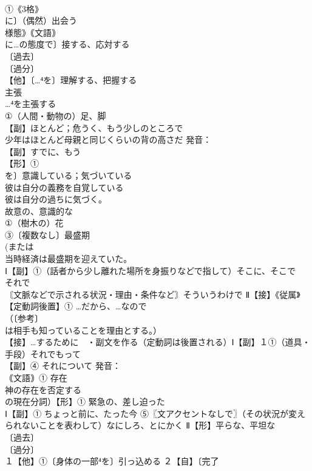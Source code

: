 \documentclass[8pt]{extreport}
\begin{document}
\begin{CJK}{UTF8}{min}
\\	①《3格》
\\	に〕（偶然）出会う 
\\	様態》｟文語｠
\\	に…の態度で〕接する、応対する 
\\	〔過去〕
\\	〔過分〕
\\	【他】〔…⁴を〕理解する、把握する 
\\	主張 
\\	…⁴を主張する
\\	①（人間・動物の）足、脚 
\\	【副】ほとんど；危うく、もう少しのところで 
\\	少年はほとんど母親と同じくらいの背の高さだ 発音：
\\	【副】すでに、もう 
\\	【形】①
\\	を〕意識している；気づいている 
\\	彼は自分の義務を自覚している 
\\	彼は自分の過ちに気づく。 
\\	故意の、意識的な
\\	①（樹木の）花 
\\	③〔複数なし〕最盛期 
\\	(または
\\	当時経済は最盛期を迎えていた。
\\	Ⅰ【副】①（話者から少し離れた場所を身振りなどで指して）そこに、そこで　
\\	それで　
\\	〘文脈などで示される状況・理由・条件など〙そういうわけで Ⅱ【接】《従属》【定動詞後置】① …だから、…なので 
\\	（〔参考〕
\\	は相手も知っていることを理由とする。） 
\\	【接】…するために　・副文を作る（定動詞は後置される）Ⅰ【副】１①（道具・手段）それでもって 
\\	【副】④ それについて 発音：
\\	｟文語｠① 存在 
\\	神の存在を否定する
\\	の現在分詞）【形】① 緊急の、差し迫った
\\	Ⅰ【副】① ちょっと前に、たった今 ⑤〖文アクセントなしで〗（その状況が変えられないことを表わして）なにしろ、とにかく Ⅱ【形】平らな、平坦な 
\\	〔過去〕
\\	〔過分〕
\\	１【他】①〔身体の一部⁴を〕引っ込める ２【自】〔完了

\end{CJK}
\end{document}
